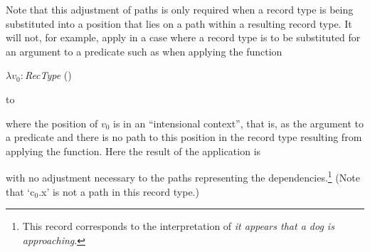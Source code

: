 Note
that this adjustment of paths is only required when a record type is being
substituted into a position that lies on a path within a resulting
record type.  It will not, for example, apply in a case where a record
type is to be substituted for an argument to a predicate such as when
applying the function
\begin{display}
$\lambda v_0:$\textit{RecType} ()
\end{display}
to
\begin{display}
\end{display}
where the position of $v_0$ is in an ``intensional context'', that is,
as the argument to a predicate and there is no path to this position
in the record type resulting from applying the function.  Here the
result of the application is
\begin{display}
\end{display}
with no adjustment necessary to the paths representing the
dependencies.\footnote{This record corresponds to the interpretation
  of \textit{it appears that a dog is approaching}.}  (Note that `c$_0$.x' is not a path in this record
type.) 

